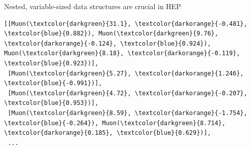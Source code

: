 \documentclass[aspectratio=169]{beamer}
\begin{document}
\begin{frame}[fragile]{Nested, variable-sized data structures are crucial in HEP}
\begin{uncoverenv}
\vspace{0.25 cm}
\scriptsize
\begin{Verbatim}[commandchars=\\\{\}]
[[Muon(\textcolor{darkgreen}{31.1}, \textcolor{darkorange}{-0.481}, \textcolor{blue}{0.882}), Muon(\textcolor{darkgreen}{9.76}, \textcolor{darkorange}{-0.124}, \textcolor{blue}{0.924}), Muon(\textcolor{darkgreen}{8.18}, \textcolor{darkorange}{-0.119}, \textcolor{blue}{0.923})],
 [Muon(\textcolor{darkgreen}{5.27}, \textcolor{darkorange}{1.246}, \textcolor{blue}{-0.991})],
 [Muon(\textcolor{darkgreen}{4.72}, \textcolor{darkorange}{-0.207}, \textcolor{blue}{0.953})],
 [Muon(\textcolor{darkgreen}{8.59}, \textcolor{darkorange}{-1.754}, \textcolor{blue}{-0.264}), Muon(\textcolor{darkgreen}{8.714}, \textcolor{darkorange}{0.185}, \textcolor{blue}{0.629})],
 ...
\end{Verbatim}
\end{uncoverenv}
\end{frame}
\end{document}
